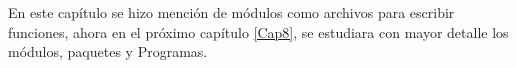 En este capítulo se hizo mención de  módulos como archivos para escribir funciones, ahora en el próximo capítulo \ref{Cap8}, se estudiara con mayor detalle los módulos, paquetes y Programas.













